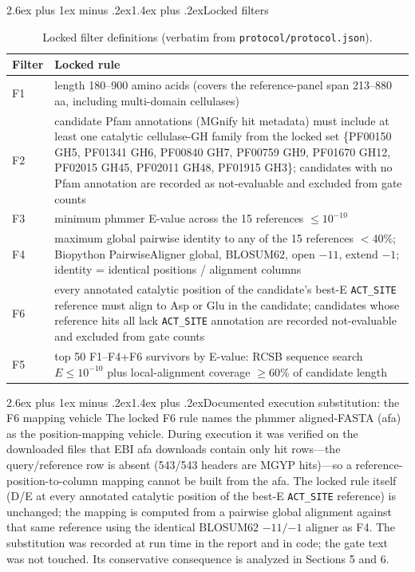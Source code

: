\documentclass[11pt]{article}
\makeatletter
\renewcommand{\subsection}{\@startsection{subsection}{2}{\z@}%
  {2.6ex plus 1ex minus .2ex}{1.4ex plus .2ex}{\large\bfseries\color{navy}}}
\makeatother
\begin{document}
\subsection{Locked filters}
\begin{table}[h]
\centering\small
{}
\begin{tabular}{|p{0.9cm}|p{13.6cm}|}
\hline
\rowcolor{lightnavy}\textbf{Filter} & \textbf{Locked rule} \\\hline
F1 & length 180--900 amino acids (covers the reference-panel span 213--880 aa, including multi-domain cellulases) \\\hline
F2 & candidate Pfam annotations (MGnify hit metadata) must include at least one catalytic cellulase-GH family from the locked set \{PF00150 GH5, PF01341 GH6, PF00840 GH7, PF00759 GH9, PF01670 GH12, PF02015 GH45, PF02011 GH48, PF01915 GH3\}; candidates with no Pfam annotation are recorded as not-evaluable and excluded from gate counts \\\hline
F3 & minimum phmmer E-value across the 15 references $\le 10^{-10}$ \\\hline
F4 & maximum global pairwise identity to any of the 15 references $<$40\%; Biopython PairwiseAligner global, BLOSUM62, open $-11$, extend $-1$; identity = identical positions / alignment columns \\\hline
F6 & every annotated catalytic position of the candidate's best-E \texttt{ACT\_SITE} reference must align to Asp or Glu in the candidate; candidates whose reference hits all lack \texttt{ACT\_SITE} annotation are recorded not-evaluable and excluded from gate counts \\\hline
F5 & top 50 F1--F4+F6 survivors by E-value: RCSB sequence search $E \le 10^{-10}$ plus local-alignment coverage $\ge$60\% of candidate length \\\hline
\end{tabular}
\caption{Locked filter definitions (verbatim from \texttt{protocol/protocol.json}).}
\end{table}

\subsection{Documented execution substitution: the F6 mapping vehicle}
The locked F6 rule names the phmmer aligned-FASTA (afa) as the position-mapping vehicle. During execution it was verified on the downloaded files that EBI afa downloads contain only hit rows---the query/reference row is absent (543/543 headers are MGYP hits)---so a reference-position-to-column mapping cannot be built from the afa. The locked rule itself (D/E at every annotated catalytic position of the best-E \texttt{ACT\_SITE} reference) is unchanged; the mapping is computed from a pairwise global alignment against that same reference using the identical BLOSUM62 $-11/{-1}$ aligner as F4. The substitution was recorded at run time in the report and in code; the gate text was not touched. Its conservative consequence is analyzed in Sections 5 and 6.
\end{document}
